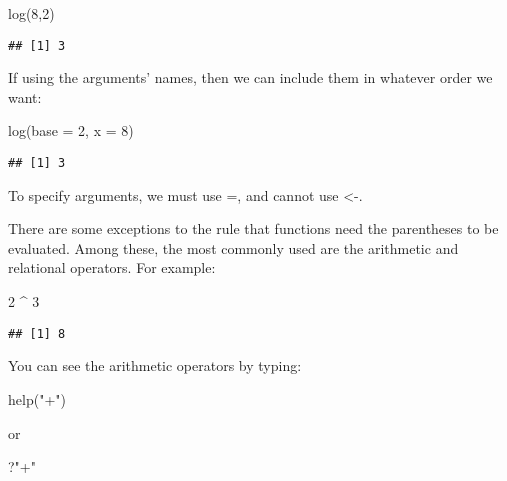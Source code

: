 \documentclass[
]{article}
\newenvironment{Shaded}{\begin{snugshade}}{\end{snugshade}}
\newcommand{\AttributeTok}[1]{\textcolor[rgb]{0.77,0.63,0.00}{#1}}
\newcommand{\DecValTok}[1]{\textcolor[rgb]{0.00,0.00,0.81}{#1}}
\newcommand{\FunctionTok}[1]{\textcolor[rgb]{0.00,0.00,0.00}{#1}}
\newcommand{\NormalTok}[1]{#1}
\newcommand{\SpecialCharTok}[1]{\textcolor[rgb]{0.00,0.00,0.00}{#1}}
\newcommand{\StringTok}[1]{\textcolor[rgb]{0.31,0.60,0.02}{#1}}
\begin{document}
\begin{Shaded}
\begin{Highlighting}[]
\FunctionTok{log}\NormalTok{(}\DecValTok{8}\NormalTok{,}\DecValTok{2}\NormalTok{)}
\end{Highlighting}
\end{Shaded}

\begin{verbatim}
## [1] 3
\end{verbatim}

If using the arguments' names, then we can include them in whatever
order we want:

\begin{Shaded}
\begin{Highlighting}[]
\FunctionTok{log}\NormalTok{(}\AttributeTok{base =} \DecValTok{2}\NormalTok{, }\AttributeTok{x =} \DecValTok{8}\NormalTok{)}
\end{Highlighting}
\end{Shaded}

\begin{verbatim}
## [1] 3
\end{verbatim}

To specify arguments, we must use =, and cannot use \textless-.

There are some exceptions to the rule that functions need the
parentheses to be evaluated. Among these, the most commonly used are the
arithmetic and relational operators. For example:

\begin{Shaded}
\begin{Highlighting}[]
\DecValTok{2} \SpecialCharTok{\^{}} \DecValTok{3}
\end{Highlighting}
\end{Shaded}

\begin{verbatim}
## [1] 8
\end{verbatim}

You can see the arithmetic operators by typing:

\begin{Shaded}
\begin{Highlighting}[]
\FunctionTok{help}\NormalTok{(}\StringTok{"+"}\NormalTok{)}
\end{Highlighting}
\end{Shaded}

or

\begin{Shaded}
\begin{Highlighting}[]
\NormalTok{?}\StringTok{"+"}
\end{Highlighting}
\end{Shaded}
\end{document}
